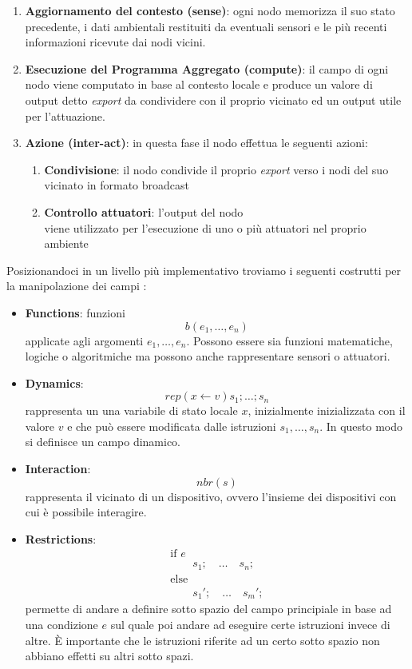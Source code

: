 \documentclass[12pt,a4paper,openright,twoside]{book}
\begin{document}
\begin{enumerate}
    \item \textbf{Aggiornamento del contesto (sense)}: ogni nodo memorizza il suo stato precedente, i dati ambientali restituiti da eventuali sensori e le più recenti informazioni ricevute dai nodi vicini.
    \item \textbf{Esecuzione del Programma Aggregato (compute)}: il campo di ogni nodo viene computato in base al contesto locale e produce un valore di output detto \textit{export} da condividere con il proprio vicinato ed un output utile per l'attuazione.
    \item \textbf{Azione (inter-act)}: in questa fase il nodo effettua le seguenti azioni:
    \begin{enumerate}
        \item \textbf{Condivisione}: il nodo condivide il proprio \textit{export} verso i nodi del suo vicinato in formato broadcast
        \item \textbf{Controllo attuatori}: l'output del nodo \\ viene 
        utilizzato per l'esecuzione di uno o più attuatori nel proprio ambiente
    \end{enumerate}
\end{enumerate}

Posizionandoci in un livello più implementativo troviamo i seguenti costrutti per la manipolazione dei campi \cite{Pianini2017}: 

\begin{itemize}
    \item \textbf{Functions}: funzioni $$ b(e_1,\dots,e_n) $$ applicate agli argomenti $e_1,\dots,e_n$. Possono essere sia funzioni matematiche, logiche o algoritmiche ma possono anche rappresentare sensori o attuatori.
    \item \textbf{Dynamics}: $$ rep(x \leftarrow v){s_1;\dots;s_n} $$ rappresenta un una variabile di stato locale $x$, inizialmente inizializzata con il valore $v$ e che può essere modificata dalle istruzioni $s_1,\dots,s_n$. In questo modo si definisce un campo dinamico.
    \item \textbf{Interaction}: $$ nbr(s) $$ rappresenta il vicinato di un dispositivo, ovvero l'insieme dei dispositivi con cui è possibile interagire.
    \item \textbf{Restrictions}: $$
        \begin{array}{l}
        \text{if } e \\
        \qquad s_1; \quad \dots \quad s_n; \\
        \text{else} \\
        \qquad s_1'; \quad \dots \quad s_m';
        \end{array}
    $$
    permette di andare a definire sotto spazio del campo principiale in base ad una condizione $e$ sul quale poi andare ad eseguire certe istruzioni invece di altre. È importante che le istruzioni riferite ad un certo sotto spazio non abbiano effetti su altri sotto spazi.
\end{itemize}
\end{document}
